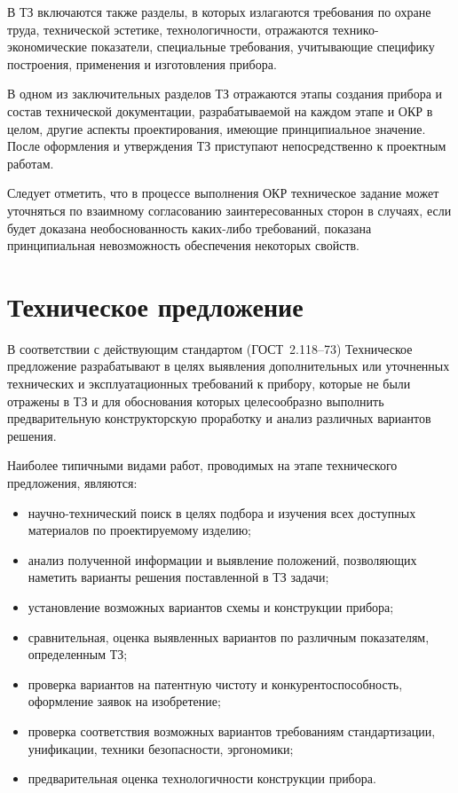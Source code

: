 В ТЗ включаются также разделы, в которых излагаются требования по охране труда, технической эстетике, технологичности, отражаются технико-экономические показатели, специальные требования, учитывающие специфику построения, применения и изготовления прибора.

В одном из заключительных разделов ТЗ отражаются этапы создания прибора и состав технической документации, разрабатываемой на каждом этапе и ОКР в целом, другие аспекты проектирования, имеющие принципиальное значение. После оформления и утверждения ТЗ приступают непосредственно к проектным работам.

Следует отметить, что в процессе выполнения ОКР техническое задание может уточняться по взаимному согласованию заинтересованных сторон в случаях, если будет доказана необоснованность каких-либо требований, показана принципиальная невозможность обеспечения некоторых свойств.

\section{Техническое предложение}

В соответствии с действующим стандартом (ГОСТ~2.118–73) Техническое предложение разрабатывают в целях выявления дополнительных или уточненных технических и эксплуатационных требований к прибору, которые не были отражены в ТЗ и для обоснования которых целесообразно выполнить предварительную конструкторскую проработку и анализ различных вариантов решения.

Наиболее типичными видами работ, проводимых на этапе технического предложения, являются:
\begin{itemize}
	\item научно-технический поиск в целях подбора и изучения всех доступных  материалов по проектируемому изделию;
	\item анализ полученной информации и выявление положений, позволяющих наметить варианты решения поставленной в ТЗ задачи;
	\item установление возможных вариантов схемы и конструкции прибора;
	\item сравнительная, оценка выявленных вариантов по различным показателям, определенным ТЗ;
	\item проверка вариантов на патентную чистоту и конкурентоспособность, оформление заявок на изобретение;
	\item проверка соответствия возможных вариантов требованиям стандартизации, унификации, техники безопасности, эргономики;
	\item предварительная оценка технологичности конструкции прибора.
\end{itemize}

